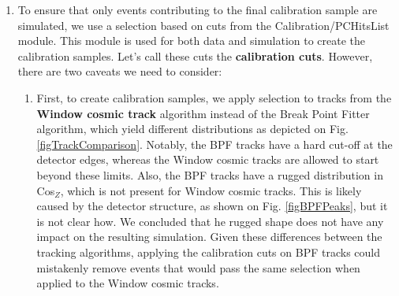 \documentclass[12pt]{article}
\begin{document}
\begin{enumerate}
\item To ensure that only events contributing to the final calibration sample are simulated, we use a selection based on cuts from the Calibration/PCHitsList module. This module is used for both data and simulation to create the calibration samples. Let's call these cuts the \textbf{calibration cuts}. However, there are two caveats we need to consider:
\begin{enumerate}
\item First, to create calibration samples, we apply selection to tracks from the \textbf{Window cosmic track} algorithm instead of the Break Point Fitter algorithm, which yield different distributions as depicted on Fig. \ref{figTrackComparison}. Notably, the BPF tracks have a hard cut-off at the detector edges, whereas the Window cosmic tracks are allowed to start beyond these limits. Also, the BPF tracks have a rugged distribution in Cos$_Z$, which is not present for Window cosmic tracks. This is likely caused by the detector structure, as shown on Fig. \ref{figBPFPeaks}, but it is not clear how. We concluded that he rugged shape does not have any impact on the resulting simulation. Given these differences between the tracking algorithms, applying the calibration cuts on BPF tracks could mistakenly remove events that would pass the same selection when applied to the Window cosmic tracks.

\begin{figure}[!ht]
\centering
{}


\end{figure}
\end{enumerate}
\end{enumerate}
\end{document}
